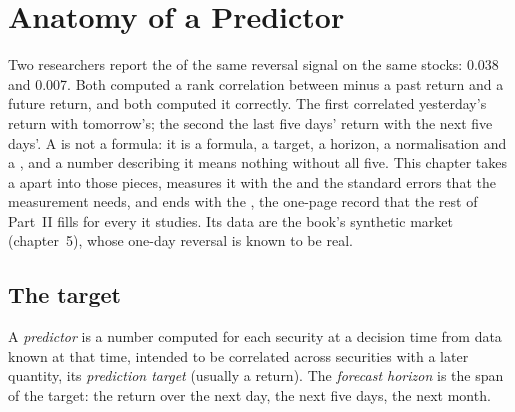 \chapter{Anatomy of a Predictor}\label{ch:rs:anatomy-of-a-predictor}

Two researchers report the  of the same reversal signal on the same stocks: 0.038 and 0.007. Both
computed a rank correlation between minus a past return and a future return, and both computed it correctly. The first
correlated yesterday's return with tomorrow's; the second the last five days' return with the next five days'. A  is
not a formula: it is a formula, a target, a horizon, a normalisation and a , and a number describing it means
nothing without all five. This chapter takes a  apart into those pieces, measures it with the  and the standard errors that the measurement needs, and ends with the , the one-page record that
the rest of Part~II fills for every  it studies. Its data are the book's synthetic market (chapter~5), whose
one-day reversal is known to be real.

\section{The target}

\begin{definition}\label{def:rs:anatomy-of-a-predictor:predictor}
A \emph{predictor} is a number computed for each security at a decision time from data known at that time,
intended to be correlated across securities with a later quantity, its \emph{prediction target}
(usually a return). The \emph{forecast horizon} is the span of the target: the return over the next
day, the next five days, the next month.
\end{definition}

